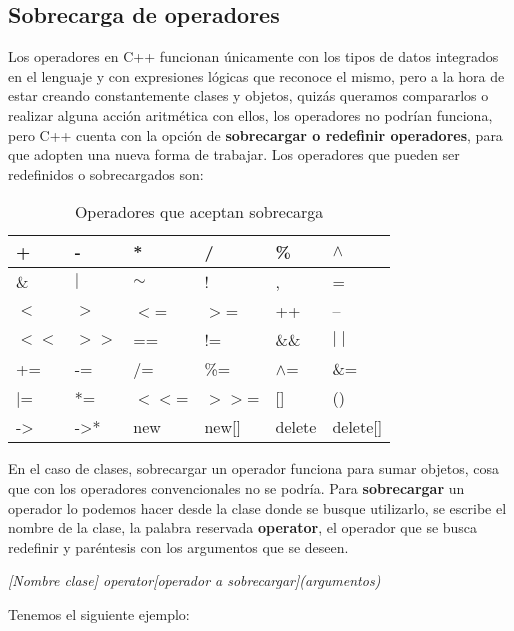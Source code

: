 \subsection{Sobrecarga de operadores}
Los operadores en C++ funcionan únicamente con los tipos de datos integrados en el lenguaje y con expresiones lógicas que reconoce el mismo, pero a la hora de estar creando constantemente clases y objetos, quizás queramos compararlos o realizar alguna acción aritmética con ellos, los operadores no podrían funciona, pero C++ cuenta con la opción de \textbf{sobrecargar o redefinir operadores}, para que adopten una nueva forma de trabajar. Los operadores que pueden ser redefinidos o sobrecargados son:
\begin{table}[ht]
    \begin{center}
        \caption{Operadores que aceptan sobrecarga}
        \label{tab: 8}
        \begin{tabular}{|l|l|l|l|l|l|}
            \hline
            +&-&*&/&\%&$\wedge$ \\ \hline
            \&&$\mid$&$\sim$&!&,&= \\ \hline
            $<$&$>$&$<$=&$>$=&++&-- \\ \hline
            $<<$&$>>$&==&!=&\&\&&$\mid\mid$ \\ \hline
            +=&-=&/=&\%=&$\wedge$=&\&= \\ \hline
            $\mid$=&*=&$<<$=&$>>$=&[]&() \\ \hline
            ->&->*&new&new[]&delete&delete[] \\
            \hline
        \end{tabular}
    \end{center}
\end{table}
En el caso de clases, sobrecargar un operador funciona para sumar objetos, cosa que con los operadores convencionales no se podría. Para \textbf{sobrecargar} un operador lo podemos hacer desde la clase donde se busque utilizarlo, se escribe el nombre de la clase, la palabra reservada \textbf{operator}, el operador que se busca redefinir y paréntesis con los argumentos que se deseen.\begin{center}\textit{[Nombre clase] operator[operador a sobrecargar](argumentos){}}\end{center}
Tenemos el siguiente ejemplo:
